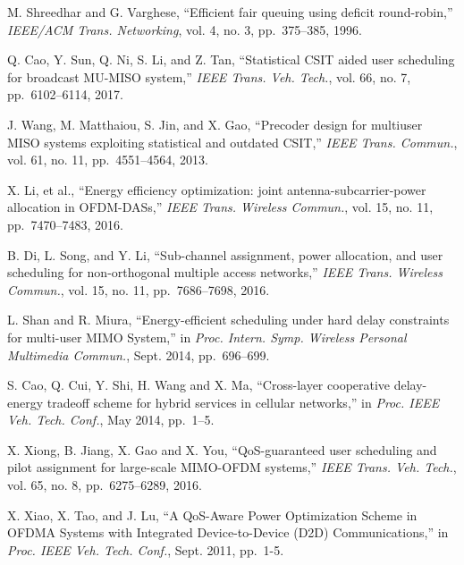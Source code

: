 \documentclass{ieeeaccess}
\begin{document}
\begin{thebibliography}{10}
  
  M. Shreedhar and G. Varghese, ``Efficient fair queuing using deficit round-robin,''
  \emph{IEEE/ACM Trans. Networking}, vol. 4, no. 3, pp.~375--385, 1996.
  
  Q. Cao, Y. Sun, Q. Ni, S. Li, and Z. Tan, ``Statistical CSIT aided user scheduling for broadcast MU-MISO system,''
  \emph{IEEE Trans. Veh. Tech.}, vol. 66, no. 7, pp.~6102--6114, 2017.
  
  J. Wang, M. Matthaiou, S. Jin, and X. Gao, ``Precoder design for multiuser MISO systems exploiting statistical and outdated CSIT,''
  \emph{IEEE Trans. Commun.}, vol. 61, no. 11, pp.~4551--4564, 2013.
  
  X. Li, et al., ``Energy efficiency optimization: joint antenna-subcarrier-power allocation in OFDM-DASs,''
  \emph{IEEE Trans. Wireless Commun.}, vol. 15, no. 11, pp.~7470--7483, 2016.
  
  B. Di, L. Song, and Y. Li, ``Sub-channel assignment, power allocation, and user scheduling for non-orthogonal multiple access networks,''
  \emph{IEEE Trans. Wireless Commun.}, vol. 15, no. 11, pp.~7686--7698, 2016.
  
  L. Shan and R. Miura, ``Energy-efficient scheduling under hard delay constraints for multi-user MIMO System,'' in
  \emph{Proc. Intern. Symp. Wireless Personal Multimedia Commun.}, Sept. 2014, pp.~696--699.
  
  S. Cao, Q. Cui, Y. Shi, H. Wang and X. Ma, ``Cross-layer cooperative delay-energy tradeoff scheme for hybrid services in cellular networks,'' in
  \emph{Proc. IEEE Veh. Tech. Conf.}, May 2014, pp.~1--5.
  
  X. Xiong, B. Jiang, X. Gao and X. You, ``QoS-guaranteed user scheduling and pilot assignment for large-scale MIMO-OFDM systems,''
  \emph{IEEE Trans. Veh. Tech.}, vol. 65, no. 8, pp.~6275--6289, 2016.
  
  
  
  X. Xiao, X. Tao, and J. Lu, ``A QoS-Aware Power Optimization Scheme in OFDMA Systems with Integrated Device-to-Device (D2D) Communications,'' in
  \emph{Proc. IEEE Veh. Tech. Conf.}, Sept. 2011, pp.~1-5.
  

\end{thebibliography}
\end{document}
